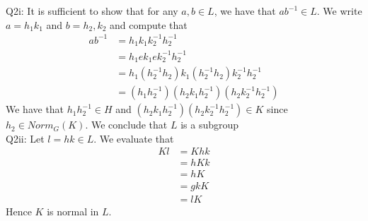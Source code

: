\documentclass[letterpaper]{article}
\begin{document}
\noindent
Q2i: It is sufficient to show that for any $a,b\in L$, we have that $ab^{-1} \in L$. 
We write $a = h_1k_1$ and $b = h_2,k_2$ and compute that 
\begin{align*}
    ab^{-1} &= h_1k_1 k_2^{-1}h_2^{-1}
    \\ &=h_1 ek_1ek_2^{-1}h_2^{-1}
    \\ & = h_1(h_2^{-1}h_2)k_1(h_2^{-1}h_2)k_2^{-1}h_2^{-1}
    \\ & =(h_1h_2^{-1})(h_2k_1h_2^{-1})(h_2k_2^{-1}h_2^{-1}) \tag{by generalized associativity}
\end{align*}
We have that $h_1h_2^{-1}\in H$ and $(h_2k_1h_2^{-1})(h_2k_2^{-1}h_2^{-1}) \in K$ since $h_2 \in Norm_G(K)$. 
We conclude that $L$ is a subgroup
\newline \\ \noindent Q2ii: Let $l = hk\in L$. We evaluate that 
\begin{align*}
    Kl & = Khk
    \\ & = hKk \tag{since h is in $Norm_G(K)$}
    \\ & = hK \tag{since kK = K}
    \\ & = gkK \tag{since K = kK}
    \\ & = lK
\end{align*} Hence $K$ is normal in $L$. 
\end{document}
